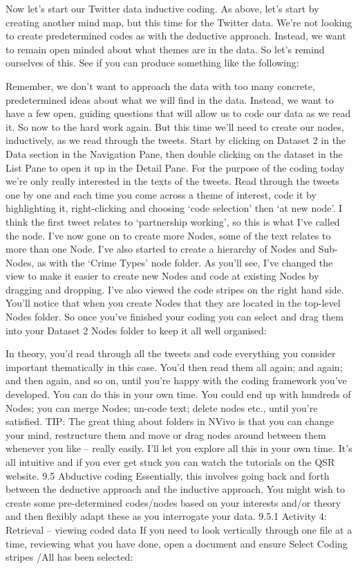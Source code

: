 \documentclass[
]{book}
\begin{document}
Now let's start our Twitter data inductive coding. As above, let's start by creating another mind map, but this time for the Twitter data. We're not looking to create predetermined codes as with the deductive approach. Instead, we want to remain open minded about what themes are in the data. So let's remind ourselves of this. See if you can produce something like the following:

Remember, we don't want to approach the data with too many concrete, predetermined ideas about what we will find in the data. Instead, we want to have a few open, guiding questions that will allow us to code our data as we read it.
So now to the hard work again. But this time we'll need to create our nodes, inductively, as we read through the tweets.
Start by clicking on Dataset 2 in the Data section in the Navigation Pane, then double clicking on the dataset in the List Pane to open it up in the Detail Pane. For the purpose of the coding today we're only really interested in the texts of the tweets.
Read through the tweets one by one and each time you come across a theme of interest, code it by highlighting it, right-clicking and choosing `code selection' then `at new node'. I think the first tweet relates to `partnership working', so this is what I've called the node. I've now gone on to create more Nodes, some of the text relates to more than one Node. I've also started to create a hierarchy of Nodes and Sub-Nodes, as with the `Crime Types' node folder. As you'll see, I've changed the view to make it easier to create new Nodes and code at existing Nodes by dragging and dropping. I've also viewed the code stripes on the right hand side. You'll notice that when you create Nodes that they are located in the top-level Nodes folder. So once you've finished your coding you can select and drag them into your Dataset 2 Nodes folder to keep it all well organised:

In theory, you'd read through all the tweets and code everything you consider important thematically in this case. You'd then read them all again; and again; and then again, and so on, until you're happy with the coding framework you've developed. You can do this in your own time. You could end up with hundreds of Nodes; you can merge Nodes; un-code text; delete nodes etc., until you're satisfied.
TIP: The great thing about folders in NVivo is that you can change your mind, restructure them and move or drag nodes around between them whenever you like -- really easily. I'll let you explore all this in your own time. It's all intuitive and if you ever get stuck you can watch the tutorials on the QSR website.
9.5 Abductive coding
Essentially, this involves going back and forth between the deductive approach and the inductive approach. You might wish to create some pre-determined codes/nodes based on your interests and/or theory and then flexibly adapt these as you interrogate your data.
9.5.1 Activity 4: Retrieval -- viewing coded data
If you need to look vertically through one file at a time, reviewing what you have done, open a document and ensure Select Coding stripes /All has been selected:
\end{document}
